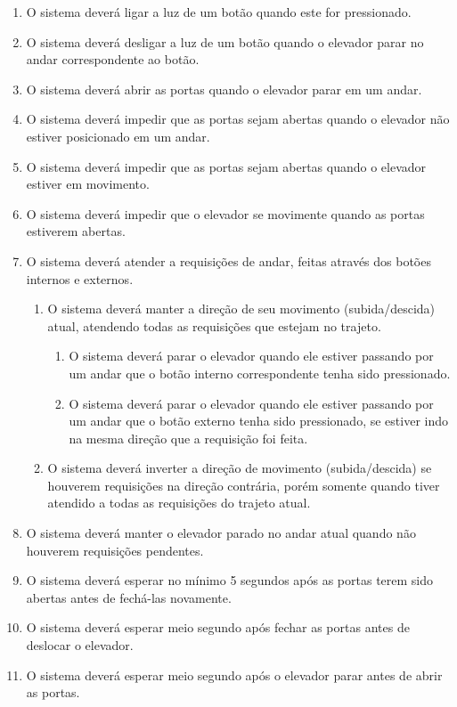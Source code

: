 \begin{enumerate}[label=RF \arabic*. , ref=\arabic*]
	\item O sistema deverá ligar a luz de um botão quando este for pressionado.
  \item O sistema deverá desligar a luz de um botão quando o elevador parar no andar correspondente ao botão.
  \item O sistema deverá abrir as portas quando o elevador parar em um andar.
  \item O sistema deverá impedir que as portas sejam abertas quando o elevador não estiver posicionado em um andar.
  \item O sistema deverá impedir que as portas sejam abertas quando o elevador estiver em movimento.
  \item O sistema deverá impedir que o elevador se movimente quando as portas estiverem abertas.
  \item O sistema deverá atender a requisições de andar, feitas através dos botões internos e externos.
  \begin{enumerate}[label*=\arabic*.]
    \item O sistema deverá manter a direção de seu movimento (subida/descida) atual, atendendo todas as requisições que estejam no trajeto.
    \begin{enumerate}[label*=\arabic*.]
        \item O sistema deverá parar o elevador quando ele estiver passando por um andar que o botão interno correspondente tenha sido pressionado.
        \item O sistema deverá parar o elevador quando ele estiver passando por um andar que o botão externo tenha sido pressionado, se estiver indo na mesma direção que a requisição foi feita.
    \end{enumerate}
    \item O sistema deverá inverter a direção de movimento (subida/descida) se houverem requisições na direção contrária, porém somente quando tiver atendido a todas as requisições do trajeto atual.
  \end{enumerate}
  \item O sistema deverá manter o elevador parado no andar atual quando não houverem requisições pendentes.
  \item O sistema deverá esperar no mínimo 5 segundos após as portas terem sido abertas antes de fechá-las novamente.
  \item O sistema deverá esperar meio segundo após fechar as portas antes de deslocar o elevador.
  \item O sistema deverá esperar meio segundo após o elevador parar antes de abrir as portas.
\end{enumerate}

